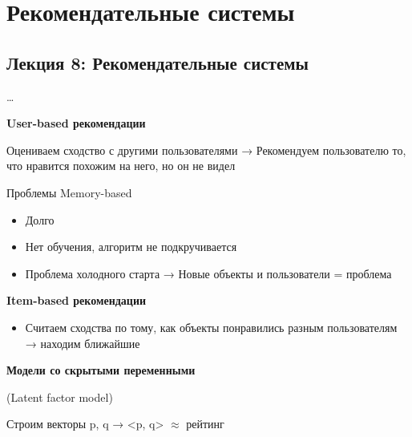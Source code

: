 \documentclass[a4paper, 12pt]{article}
\begin{document}
\section{\texorpdfstring{\textbf{Рекомендательные
системы}}{Рекомендательные системы}}\label{ux440ux435ux43aux43eux43cux435ux43dux434ux430ux442ux435ux43bux44cux43dux44bux435-ux441ux438ux441ux442ux435ux43cux44b}

\subsection{\texorpdfstring{\textbf{Лекция 8: Рекомендательные
системы}}{Лекция 8: Рекомендательные системы}}\label{ux43bux435ux43aux446ux438ux44f-8-ux440ux435ux43aux43eux43cux435ux43dux434ux430ux442ux435ux43bux44cux43dux44bux435-ux441ux438ux441ux442ux435ux43cux44b}

\ldots{}

\textbf{User-based рекомендации}

Оцениваем сходство с другими пользователями → Рекомендуем пользователю
то, что нравится похожим на него, но он не видел

{Проблемы Memory-based}

\begin{itemize}
\item
  
  Долго
  
\item
  
  Нет обучения, алгоритм не подкручивается
  
\item
  
  Проблема холодного старта → Новые объекты и пользователи = проблема
  
\end{itemize}

\textbf{Item-based рекомендации}

\begin{itemize}
\item
  
  Считаем сходства по тому, как объекты понравились разным пользователям
  → находим ближайшие
  
\end{itemize}

\textbf{Модели со скрытыми переменными}

{(Latent factor model)}

Строим векторы p, q → \textless{}p, q\textgreater{} \(\approx\) рейтинг
\end{document}
